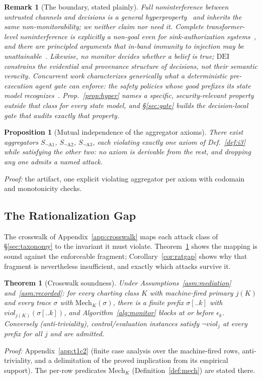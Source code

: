 \documentclass[conference,compsoc]{IEEEtran}
\newtheorem{proposition}{Proposition}
\newtheorem{remark}{Remark}
\newtheorem{theorem}{Theorem}
\theoremstyle{definition}
\theoremstyle{plain}
\newcommand{\DEI}{\ensuremath{\mathrm{DEI}}}
\begin{document}
\begin{remark}[The boundary, stated plainly]
Full noninterference between untrusted channels and decisions is a
general hyperproperty~\cite{hyperprops,goguen} and inherits the same
non-monitorability; we neither claim nor need it. Complete
transformer-level noninterference is explicitly a non-goal even for
sink-authorization systems~\cite{cxi}, and there are principled
arguments that in-band immunity to injection may be
unattainable~\cite{abdelnabi}. Likewise, no monitor decides whether a
belief is \emph{true}; \DEI{} constrains the evidential and provenance
structure of decisions, not their semantic veracity. Concurrent work
characterizes generically what a deterministic pre-execution agent gate
can enforce: the safety policies whose good prefixes its state model
recognizes~\cite{ray2026enforced}. Prop.~\ref{prop:hyper} names a
specific, security-relevant property outside that class for
\emph{every} state model, and \S\ref{sec:gate} builds the
decision-local gate that audits exactly that property.
\end{remark}

\begin{proposition}[Mutual independence of the aggregator axioms]
\label{prop:indep}
There exist aggregators $S_{\neg\mathrm{A1}}$, $S_{\neg\mathrm{A2}}$,
$S_{\neg\mathrm{A3}}$, each violating exactly one axiom of
Def.~\ref{def:i3} while satisfying the other two: no axiom is
derivable from the rest, and dropping any one admits a named attack.
\end{proposition}
\noindent\emph{Proof:} the artifact, one explicit violating aggregator
per axiom with codomain and monotonicity checks.

\subsection{The Rationalization Gap}
\label{sec:guarantees}
The crosswalk of Appendix~\ref{app:crosswalk} maps each attack class of
\S\ref{sec:taxonomy} to the invariant it must violate.
Theorem~\ref{thm:crosswalk} shows the mapping is sound against the
enforceable fragment; Corollary~\ref{cor:ratgap} shows why that
fragment is nevertheless insufficient, and exactly which attacks
survive it.

\begin{theorem}[Crosswalk soundness]
\label{thm:crosswalk}
Under Assumptions~\ref{asm:mediation} and~\ref{asm:recorded}: for
every charting class $K$ with machine-fired primary $j(K)$ and every
trace $\sigma$ with $\mathrm{Mech}_K(\sigma)$, there is a finite prefix
$\sigma[..k]$ with $\mathit{viol}_{j(K)}(\sigma[..k])$, and
Algorithm~\ref{alg:monitor} blocks at or before $\epsilon_k$. Conversely
(anti-triviality), control/evaluation instances satisfy $\neg
\mathit{viol}_j$ at every prefix for all $j$ and are admitted.
\end{theorem}
\noindent\emph{Proof:} Appendix~\ref{app:t1c2} (finite case analysis
over the machine-fired rows, anti-triviality, and a delimitation of the
proved implication from its empirical support). The per-row predicates
$\mathrm{Mech}_K$ (Definition~\ref{def:mech}) are stated there.
\end{document}
